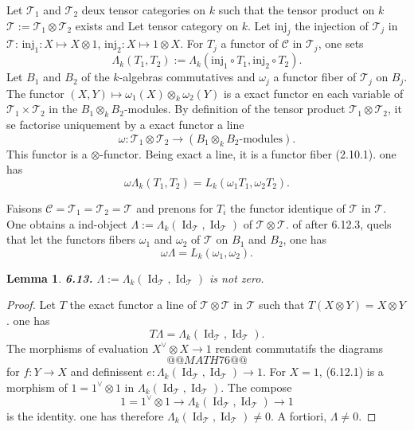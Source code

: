 \documentclass[12pt,a4paper]{article}
\theoremstyle{plain}
\newtheorem{lemma}[theorem]{Lemma}
\theoremstyle{definition}
\theoremstyle{remark}
\DeclareMathOperator{\Id}{Id}
\begin{document}
Let $\mathcal{T}_1$ and $\mathcal{T}_2$ deux tensor categories on $k$ such that the tensor product on $k$ $\mathcal{T} := \mathcal{T}_1 \otimes \mathcal{T}_2$ exists and Let tensor category on $k$. Let $\mathrm{inj}_j$ the injection of $\mathcal{T}_j$ in $\mathcal{T}$: $\mathrm{inj}_1 : X \mapsto X \otimes 1$, $\mathrm{inj}_2 : X \mapsto 1 \otimes X$. For $T_j$ a functor of $\mathcal{C}$ in $\mathcal{T}_j$, one sets
\[
\Lambda_k(T_1, T_2) := \Lambda_k(\mathrm{inj}_1 \circ T_1, \mathrm{inj}_2 \circ T_2).
\]
Let $B_1$ and $B_2$ of the $k$-algebras commutatives and $\omega_j$ a functor fiber of $\mathcal{T}_j$ on $B_j$. The functor $(X,Y) \mapsto \omega_1(X) \otimes_k \omega_2(Y)$ is a exact functor en each variable of $\mathcal{T}_1 \times \mathcal{T}_2$ in the $B_1 \otimes_k B_2$-modules. By definition of the tensor product $\mathcal{T}_1 \otimes \mathcal{T}_2$, it se factorise uniquement by a exact functor a line
\[
\omega : \mathcal{T}_1 \otimes \mathcal{T}_2 \to (B_1 \otimes_k B_2\text{-modules}).
\]
This functor is a $\otimes$-functor. Being exact a line, it is a functor fiber (2.10.1). one has
\begin{equation}\label{eq:6.12.3}
\omega \Lambda_k(T_1,T_2) = L_k(\omega_1 T_1, \omega_2 T_2).
\end{equation}

Faisons $\mathcal{C} = \mathcal{T}_1 = \mathcal{T}_2 = \mathcal{T}$ and prenons for $T_i$ the functor identique of $\mathcal{T}$ in $\mathcal{T}$. One obtains a ind-object $\Lambda := \Lambda_k(\Id_\mathcal{T}, \Id_\mathcal{T})$ of $\mathcal{T} \otimes \mathcal{T}$. of after 6.12.3, quels that let the functors fibers $\omega_1$ and $\omega_2$ of $\mathcal{T}$ on $B_1$ and $B_2$, one has
\begin{equation}\label{eq:6.12.4}
\omega \Lambda = L_k(\omega_1, \omega_2).
\end{equation}

\begin{lemma}\label{lem:6.13}
\textbf{6.13.} $\Lambda := \Lambda_k(\Id_\mathcal{T}, \Id_\mathcal{T})$ is not zero.
\end{lemma}

\begin{proof}
Let $T$ the exact functor a line of $\mathcal{T} \otimes \mathcal{T}$ in $\mathcal{T}$ such that $T(X \otimes Y) = X \otimes Y$. one has
\[
T \Lambda = \Lambda_k(\Id_\mathcal{T}, \Id_\mathcal{T}).
\]
The morphisms of evaluation $X^\vee \otimes X \to 1$ rendent commutatifs the diagrams
\[
@@MATH76@@
\]
for $f : Y \to X$ and definissent $e : \Lambda_k(\Id_\mathcal{T}, \Id_\mathcal{T}) \to 1$. For $X = 1$, (6.12.1) is a morphism of $1 = 1^\vee \otimes 1$ in $\Lambda_k(\Id_\mathcal{T}, \Id_\mathcal{T})$. The compose
\[
1 = 1^\vee \otimes 1 \to \Lambda_k(\Id_\mathcal{T}, \Id_\mathcal{T}) \to 1
\]
is the identity. one has therefore $\Lambda_k(\Id_\mathcal{T}, \Id_\mathcal{T}) \neq 0$. A fortiori, $\Lambda \neq 0$.
\end{proof}
\end{document}
